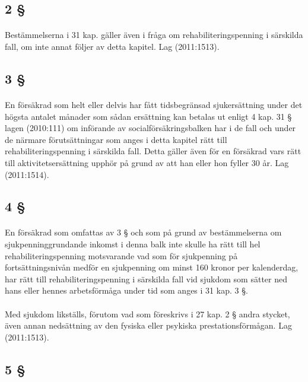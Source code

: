 \documentclass[a4paper,notitlepage,openany,10pt]{book}
\begin{document}
\subsection*{2 §}
\paragraph*{}
Bestämmelserna i 31 kap. gäller även i fråga om rehabiliteringspenning i särskilda fall, om inte annat följer av detta kapitel.
Lag (2011:1513).
\subsection*{3 §}
\paragraph*{}
En försäkrad som helt eller delvis har fått tidsbegränsad sjukersättning under det högsta antalet månader som sådan ersättning kan betalas ut enligt 4 kap. 31 § lagen (2010:111) om införande av socialförsäkringsbalken har i de fall och under de närmare förutsättningar som anges i detta kapitel rätt till rehabiliteringspenning i särskilda fall. Detta gäller även för en försäkrad vars rätt till aktivitetsersättning upphör på grund av att han eller hon fyller 30 år.
Lag (2011:1514).
\subsection*{4 §}
\paragraph*{}
En försäkrad som omfattas av 3 § och som på grund av bestämmelserna om sjukpenninggrundande inkomst i denna balk inte skulle ha rätt till hel rehabiliteringspenning motsvarande vad som för sjukpenning på fortsättningsnivån medför en sjukpenning om minst 160 kronor per kalenderdag, har rätt till rehabiliteringspenning i särskilda fall vid sjukdom som sätter ned hans eller hennes arbetsförmåga under tid som anges i 31 kap. 3 §.
\paragraph*{}
Med sjukdom likställs, förutom vad som föreskrivs i 27 kap. 2 § andra stycket, även annan nedsättning av den fysiska eller psykiska prestationsförmågan.
Lag (2011:1513).
\subsection*{5 §}
\end{document}
